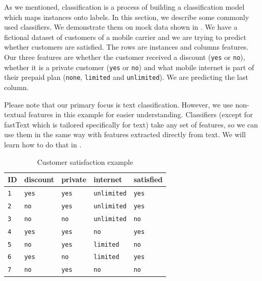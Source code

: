 As we mentioned, classification is a process of building a classification model which maps
instances onto labels.
In this section, we describe some commonly used classifiers.
We demonstrate them on mock data shown in .
We have a fictional dataset of customers of a mobile carrier and
we are trying to predict whether customers are satisfied.
The rows are instances and columns features.
Our three features are 
whether the customer received a discount (\texttt{yes} or \texttt{no}), whether it is a private customer (\texttt{yes} or \texttt{no})
and what mobile internet is part of their prepaid plan (\texttt{none}, \texttt{limited} and \texttt{unlimited}).
We are predicting the last column.

Please note that our primary focus is text classification.
However, we use non-textual features in this example for easier understanding.
Classifiers (except for fastText which is tailored specifically for text) take any set of features,
so we can use them in the same way with features extracted directly from text.
We will learn how to do that in .

\begin{table}[h!]

\centering
\begin{tabular}{lllll}
\toprule
\textbf{ID} & \textbf{discount} & \textbf{private} & \textbf{internet} \hspace{1.cm} & \textbf{satisfied} \\
\midrule
\texttt{1} & \texttt{yes} & \texttt{yes} & \texttt{unlimited} & \texttt{yes} \\
\texttt{2} & \texttt{no} & \texttt{yes} & \texttt{unlimited} & \texttt{yes} \\
\texttt{3} & \texttt{no} & \texttt{no} & \texttt{unlimited} & \texttt{no} \\
\texttt{4} & \texttt{yes} & \texttt{yes} & \texttt{no} & \texttt{yes} \\
\texttt{5} & \texttt{no} & \texttt{yes} & \texttt{limited} & \texttt{no} \\
\texttt{6} & \texttt{yes} & \texttt{no} & \texttt{limited} & \texttt{yes} \\
\texttt{7} & \texttt{no} & \texttt{yes} & \texttt{no} & \texttt{no} \\
\bottomrule
\end{tabular}

\caption{Customer satisfaction example}\label{tab:custsatis}
\end{table}






